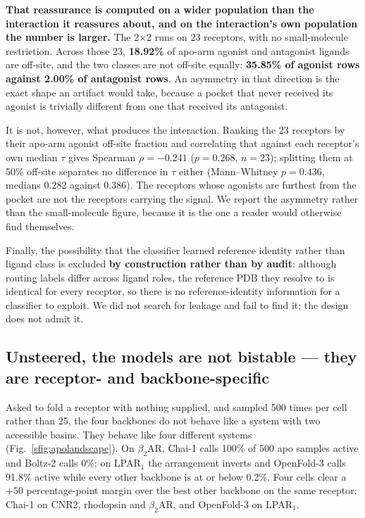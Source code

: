 \textbf{That reassurance is computed on a wider population than the interaction
it reassures about, and on the interaction's own population the number is
larger.} The 2$\times$2 runs on 23 receptors, with no small-molecule
restriction. Across those 23, \textbf{18.92\%} of apo-arm agonist and antagonist
ligands are off-site, and the two classes are not off-site equally:
\textbf{35.85\% of agonist rows against 2.00\% of antagonist rows}. An asymmetry
in that direction is the exact shape an artifact would take, because a pocket
that never received its agonist is trivially different from one that received
its antagonist.

It is not, however, what produces the interaction. Ranking the 23 receptors by
their apo-arm agonist off-site fraction and correlating that against each
receptor's own median $\tau$ gives Spearman $\rho = -0.241$ ($p = 0.268$,
$n = 23$); splitting them at 50\% off-site separates no difference in $\tau$
either (Mann--Whitney $p = 0.436$, medians 0.282 against 0.386). The receptors
whose agonists are furthest from the pocket are not the receptors carrying the
signal. We report the asymmetry rather than the small-molecule figure, because
it is the one a reader would otherwise find themselves.

Finally, the possibility that the classifier learned reference identity rather
than ligand class is excluded \textbf{by construction rather than by audit}:
although routing labels differ across ligand roles, the reference PDB they
resolve to is identical for every receptor, so there is no reference-identity
information for a classifier to exploit. We did not search for leakage and fail
to find it; the design does not admit it.

\subsection*{Unsteered, the models are not bistable --- they are receptor- and backbone-specific}

Asked to fold a receptor with nothing supplied, and sampled 500 times per cell
rather than 25, the four backbones do not behave like a system with two
accessible basins. They behave like four different systems
(Fig.~\ref{sfig:apolandscape}). On $\beta_2$AR, Chai-1 calls 100\% of 500 apo
samples active and Boltz-2 calls 0\%; on LPAR$_1$ the arrangement inverts and
OpenFold-3 calls 91.8\% active while every other backbone is at or below 0.2\%.
Four cells clear a $+50$ percentage-point margin over the best other backbone on
the same receptor: Chai-1 on CNR2, rhodopsin and $\beta_2$AR, and OpenFold-3 on
LPAR$_1$.

